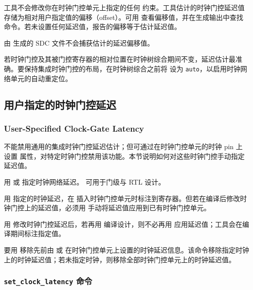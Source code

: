 工具不会修改你在时钟门控单元上指定的任何  约束。工具估计的时钟门控延迟值存储为相对用户指定值的偏移（offset）。可用  查看偏移值，并在生成输出中查找  命令。若未设置任何延迟值，报告的偏移等于估计延迟值。

由  生成的 SDC 文件不会捕获估计的延迟偏移值。

若时钟门控及其被门控寄存器的相对位置在时钟树综合期间不变，延迟估计最准确。要保持集成时钟门控的布局，在时钟树综合之前将  设为 \texttt{auto}，以启用时钟网络单元的自动重定位。

\subsection{用户指定的时钟门控延迟}
\subsubsection*{User-Specified Clock-Gate Latency}

不能禁用通用的集成时钟门控延迟估计；但可通过在时钟门控单元的时钟 pin 上设置  属性，对特定时钟门控禁用该功能。本节说明如何对这些时钟门控手动指定延迟值。

用  或  指定时钟网络延迟。 可用于门级与 RTL 设计。

用  指定的时钟延迟，在  插入时钟门控单元时标注到寄存器。但若在编译后修改时钟门控上的延迟值，必须用  手动将延迟值应用到已有时钟门控单元。

\begin{noteBox}
用  修改时钟门控延迟后，若再用  编译设计，则不必再用  应用延迟值；工具会在编译期间标注指定值。
\end{noteBox}

要用  移除先前由  或  在时钟门控单元上设置的时钟延迟信息。该命令移除指定时钟上的时钟延迟值；若未指定时钟，则移除全部时钟门控单元上的时钟延迟值。

\subsubsection{\texttt{set\_clock\_latency} 命令}
